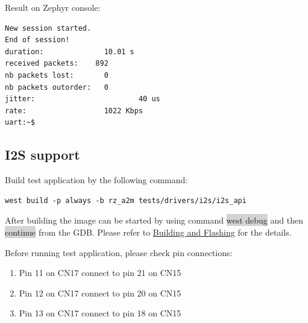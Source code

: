 \documentclass[11pt,a4paper,oneside]{article}
\begin{document}
Result on Zephyr console:
\begin{lstlisting}
New session started.
End of session!
duration:              10.01 s
received packets:    892
nb packets lost:       0
nb packets outorder:   0
jitter:                        40 us
rate:                  1022 Kbps
uart:~$
\end{lstlisting}

\subsection{I2S support}\label{i2s-support}

Build test application by the following command:
\begin{lstlisting}
west build -p always -b rz_a2m tests/drivers/i2s/i2s_api
\end{lstlisting}

After building the image can be started by using command \colorbox{lightgray}{west debug}
and then \colorbox{lightgray}{continue} from the GDB. Please refer to
\hyperref[building-and-flashing]{Building and Flashing} for
the details.

Before running test application, please check pin connections:
\begin{enumerate}
  \def\labelenumi{\arabic{enumi})}
  \item
    Pin 11 on CN17 connect to pin 21 on CN15
  \item
    Pin 12 on CN17 connect to pin 20 on CN15
  \item
    Pin 13 on CN17 connect to pin 18 on CN15
  \end{enumerate}
\end{document}
